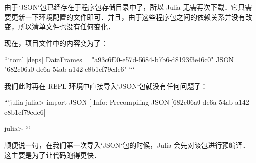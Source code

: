 由于`JSON`包已经存在于程序包存储目录中了，所以 Julia 无需再次下载．它只需要更新一下环境配置的文件即可．并且，由于这些程序包之间的依赖关系并没有改变，所以清单文件也没有任何变化．

现在，项目文件中的内容变为了：

```toml
[deps]
DataFrames = "a93c6f00-e57d-5684-b7b6-d8193f3e46c0"
JSON = "682c06a0-de6a-54ab-a142-c8b1cf79cde6"
```

我们此时再在 REPL 环境中直接导入`JSON`包就没有任何问题了：

```julia
julia> import JSON
[ Info: Precompiling JSON [682c06a0-de6a-54ab-a142-c8b1cf79cde6]

julia> 
```

顺便说一句，在我们第一次导入`JSON`包的时候，Julia 会先对该包进行预编译．这主要是为了让代码跑得更快．